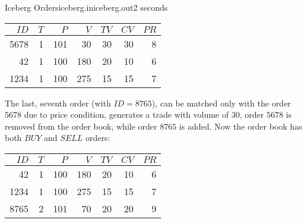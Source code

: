 \begin{problem}{Iceberg Orders}{iceberg.in}{iceberg.out}{2 seconds}
\begin{tabular}{| r r r r r r | r |} 
\hline
$ID$ & $T$ & $P$ & $V$ & $TV$ & $CV$ & $PR$ \\ \hline
5678 & 1 & 101 &  30 & 30 & 30 & 8 \\ \hline
  42 & 1 & 100 & 180 & 20 & 10 & 6 \\
1234 & 1 & 100 & 275 & 15 & 15 & 7 \\
\hline
\end{tabular}

The last, seventh order (with $ID=8765$), can be matched only with the order $5678$ due to price condition, generates a trade
with volume of $30$, order $5678$ is removed from the order book, while order $8765$ is added. 
Now the order book has both $BUY$ and $SELL$ orders:

\begin{tabular}{| r r r r r r | r |} 
\hline
$ID$ & $T$ & $P$ & $V$ & $TV$ & $CV$ & $PR$ \\ \hline
  42 & 1 & 100 & 180 & 20 & 10 & 6 \\
1234 & 1 & 100 & 275 & 15 & 15 & 7 \\ \hline
8765 & 2 & 101 &  70 & 20 & 20 & 9 \\
\hline
\end{tabular}

\end{problem}
